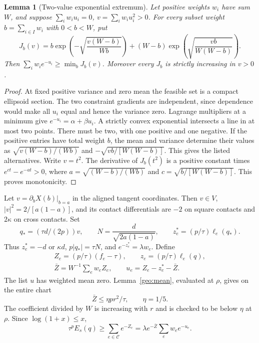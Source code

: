 \documentclass[12pt,reqno]{amsart}
\newtheorem{lemma}[theorem]{Lemma}
\theoremstyle{definition}
\numberwithin{equation}{section}
\begin{document}
\begin{lemma}[Two-value exponential extremum]\label{r3:twovalue}
Let positive weights $w_i$ have sum $W$, and suppose
$\sum_iw_iu_i=0$, $v=\sum_iw_iu_i^2>0$. For every subset weight
$b=\sum_{i\in I}w_i$ with $0<b<W$, put
\[
 J_b(v)=b\exp\left(-\sqrt{\frac{v(W-b)}{Wb}}\right)
 +(W-b)\exp\left(\sqrt{\frac{vb}{W(W-b)}}\right).
\]
Then $\sum_iw_ie^{-u_i}\ge\min_b J_b(v)$. Moreover every $J_b$ is strictly
increasing in $v>0$.
\end{lemma}
\begin{proof}
At fixed positive variance and zero mean the feasible set is a compact
ellipsoid section. The two constraint gradients are independent, since
dependence would make all $u_i$ equal and hence the variance zero.
Lagrange multipliers at a minimum give $e^{-u_i}=\alpha+\beta u_i$.
A strictly convex exponential intersects a line in at most two points.
There must be two, with one positive and one negative. If the positive
entries have total weight $b$, the mean and variance determine their
values as $\sqrt{v(W-b)/(Wb)}$ and $-\sqrt{vb/[W(W-b)]}$. This gives the
listed alternatives. Write $v=t^2$. The derivative of $J_b(t^2)$ is a
positive constant times $e^{ct}-e^{-at}>0$, where
$a=\sqrt{(W-b)/(Wb)}$ and $c=\sqrt{b/[W(W-b)]}$. This proves monotonicity.
\end{proof}


Let $v=\partial_bX(b)|_{b=a}$ in the aligned tangent coordinates.
Then $v\in V$, $|v|^2=2/[a(1-a)]$, and its contact differentials are
$-2$ on square contacts and $2\kappa$ on cross contacts. Set
\[
 q_*=(\tau d/(2p))v,\qquad N=\frac d{\sqrt{2a(1-a)}},\qquad
 z_e^*=(p/\tau)\ell_e(q_*).
\]
Thus $z_e^*=-d$ or $\kappa d$, $p|q_*|=\tau N$, and
$e^{-z_e^*}=\lambda w_e$. Define
\[
 \begin{gathered}
 Z_e=(p/\tau)(f_e-\tau),\qquad z_e=(p/\tau)\ell_e(q),\\
 \bar Z=W^{-1}\sum_ew_eZ_e,\qquad u_e=Z_e-z_e^*-\bar Z.
 \end{gathered}
\]
The list $u$ has weighted mean zero. Lemma~\ref{geo:mean}, evaluated
at $\rho$, gives on the entire chart
\begin{equation}\label{tail:mean}
 \bar Z\le\eta pr^2/\tau,\qquad \eta=1/5.
\end{equation}
The coefficient divided by $W$ is increasing with $r$ and is checked
to be below $\eta$ at $\rho$. Since $\log(1+x)\le x$,
\begin{equation}\label{tail:contactenergy}
 \tau^pE_s(q)\ge\sum_{e\in\mathcal C}e^{-Z_e}
              =\lambda e^{-\bar Z}\sum_ew_ee^{-u_e}.
\end{equation}
\end{document}

